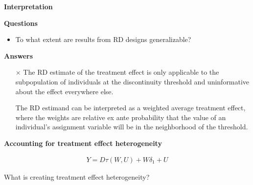 \begin{frame}\begin{center}
		\LARGE\textbf{Interpretation}
\end{center}\end{frame}
\begin{frame}\textbf{Questions}\vspace{0.3cm}

\begin{itemize}\setlength\itemsep{1em}
\item To what extent are results from RD designs generalizable?
\end{itemize}

\end{frame}
\begin{frame}\textbf{Answers}\vspace{0.3cm}

\begin{itemize}\setlength\itemsep{1em}
\item[$\times$] The RD estimate of the treatment effect is only applicable to the subpopulation of individuals at the discontinuity threshold and uninformative about the effect everywhere else.

\item[\checkmark] The RD estimand can be interpreted as a weighted average treatment effect, where the weights are relative ex ante probability that the value of an individual's assignment variable will be in the neighborhood of the threshold.
\end{itemize}

\end{frame}
\begin{frame}\textbf{Accounting for treatment effect heterogeneity}\vspace{0.3cm}

\begin{align*}
Y = D \tau(W, U) + W \delta_1 + U
\end{align*}

What is creating treatment effect heterogeneity?

\end{frame}

